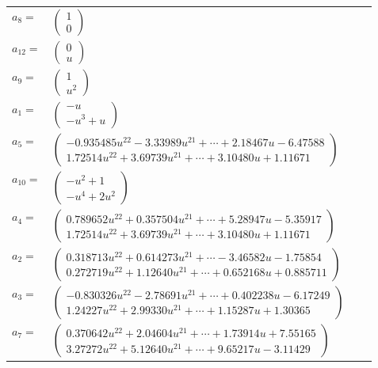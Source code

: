 \documentclass[1p]{elsarticle_modified}
\theoremstyle{definition}
\begin{document}
\begin{tabular}{m{7pt} m{180pt} m{7pt} m{180pt} }
\flushright $a_{8}=$&$\begin{pmatrix}1\\0\end{pmatrix}$ \\
\flushright $a_{12}=$&$\begin{pmatrix}0\\u\end{pmatrix}$ \\
\flushright $a_{9}=$&$\begin{pmatrix}1\\u^2\end{pmatrix}$ \\
\flushright $a_{1}=$&$\begin{pmatrix}- u\\- u^3+u\end{pmatrix}$ \\
\flushright $a_{5}=$&$\begin{pmatrix}-0.935485 u^{22}-3.33989 u^{21}+\cdots+2.18467 u-6.47588\\1.72514 u^{22}+3.69739 u^{21}+\cdots+3.10480 u+1.11671\end{pmatrix}$ \\
\flushright $a_{10}=$&$\begin{pmatrix}- u^2+1\\- u^4+2 u^2\end{pmatrix}$ \\
\flushright $a_{4}=$&$\begin{pmatrix}0.789652 u^{22}+0.357504 u^{21}+\cdots+5.28947 u-5.35917\\1.72514 u^{22}+3.69739 u^{21}+\cdots+3.10480 u+1.11671\end{pmatrix}$ \\
\flushright $a_{2}=$&$\begin{pmatrix}0.318713 u^{22}+0.614273 u^{21}+\cdots-3.46582 u-1.75854\\0.272719 u^{22}+1.12640 u^{21}+\cdots+0.652168 u+0.885711\end{pmatrix}$ \\
\flushright $a_{3}=$&$\begin{pmatrix}-0.830326 u^{22}-2.78691 u^{21}+\cdots+0.402238 u-6.17249\\1.24227 u^{22}+2.99330 u^{21}+\cdots+1.15287 u+1.30365\end{pmatrix}$ \\
\flushright $a_{7}=$&$\begin{pmatrix}0.370642 u^{22}+2.04604 u^{21}+\cdots+1.73914 u+7.55165\\3.27272 u^{22}+5.12640 u^{21}+\cdots+9.65217 u-3.11429\end{pmatrix}$ \\

\end{tabular}
\end{document}
